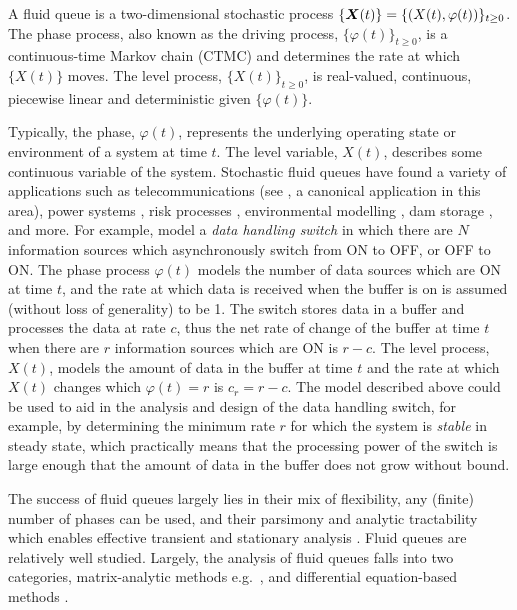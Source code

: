 		

A fluid queue is a two-dimensional stochastic process \(\{{\boldsymbol X}(t)\} = \{( X(t),\varphi(t))\}_{t\geq0}\). The phase process, also known as the driving process, \(\{\varphi(t)\}_{t\geq0}\), is a continuous-time Markov chain (CTMC) and determines the rate at which \(\{ X(t)\}\) moves. The level process, \(\{ X(t)\}_{t\geq0}\), is real-valued, continuous, piecewise linear and deterministic given \(\{\varphi(t)\}\). 

Typically, the phase, \(\varphi(t)\), represents the underlying operating state or environment of a system at time \(t\). The level variable, \(X(t)\), describes some continuous variable of the system. Stochastic fluid queues have found a variety of applications such as telecommunications (see \cite{anick1982}, a canonical application in this area), power systems \citep{hydro}, risk processes \citep{betal2005}, environmental modelling \citep{wurm2020}, dam storage \citep{loynes1962}, and more. For example, \cite{anick1982} model a \emph{data handling switch} in which there are \(N\) information sources which asynchronously switch from ON to OFF, or OFF to ON. The phase process \(\varphi(t)\) models the number of data sources which are ON at time \(t\), and the rate at which data is received when the buffer is on is assumed (without loss of generality) to be 1. The switch stores data in a buffer and processes the data at rate \(c\), thus the net rate of change of the buffer at time \(t\) when there are \(r\) information sources which are ON is \(r-c\). The level process, \(X(t)\), models the amount of data in the buffer at time \(t\) and the rate at which \(X(t)\) changes which \(\varphi(t)=r\) is \(c_r=r-c\). The model described above could be used to aid in the analysis and design of the data handling switch, for example, by determining the minimum rate \(r\) for which the system is \emph{stable} in steady state, which practically means that the processing power of the switch is large enough that the amount of data in the buffer does not grow without bound. 

The success of fluid queues largely lies in their mix of flexibility, any (finite) number of phases can be used, and their parsimony and analytic tractability which enables effective transient and stationary analysis \cite{ajr2005,ar2003,ar2004,bean2005b,bean2005,bot08,bean2009,dasilva2005,latouche2018,bnp2018}. Fluid queues are relatively well studied. Largely, the analysis of fluid queues falls into two categories, matrix-analytic methods e.g.~\cite{ajr2005,ar2003,ar2004,bean2005b,bean2005,bot08,bean2009,dasilva2005,latouche2018}, and differential equation-based methods \cite{anick1982,kk1995,blnos2022}. %

